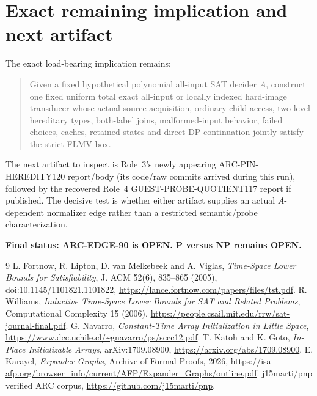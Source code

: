 \documentclass[11pt]{article}
\begin{document}
\section{Exact remaining implication and next artifact}
The exact load-bearing implication remains:
\begin{quote}
Given a fixed hypothetical polynomial all-input SAT decider $A$, construct one
fixed uniform total exact all-input or locally indexed hard-image transducer
whose actual source acquisition, ordinary-child access, two-level hereditary
types, both-label joins, malformed-input behavior, failed choices, caches,
retained states and direct-DP continuation jointly satisfy the strict FLMV
box.
\end{quote}
The next artifact to inspect is Role~3's newly appearing
ARC-PIN-HEREDITY120 report/body (its code/raw commits arrived during this run),
followed by the recovered Role~4 GUEST-PROBE-QUOTIENT117 report if published.
The decisive test is whether either artifact supplies an actual $A$-dependent
normalizer edge rather than a restricted semantic/probe characterization.

\textbf{Final status: ARC-EDGE-90 is OPEN.  P versus NP remains OPEN.}

\begin{thebibliography}{9}
 L. Fortnow, R. Lipton, D. van Melkebeek and A. Viglas,
\emph{Time-Space Lower Bounds for Satisfiability}, J. ACM 52(6), 835--865
(2005), doi:10.1145/1101821.1101822,
\url{https://lance.fortnow.com/papers/files/tst.pdf}.
 R. Williams, \emph{Inductive Time-Space Lower Bounds for
SAT and Related Problems}, Computational Complexity 15 (2006),
\url{https://people.csail.mit.edu/rrw/sat-journal-final.pdf}.
 G. Navarro, \emph{Constant-Time Array Initialization in
Little Space}, \url{https://www.dcc.uchile.cl/~gnavarro/ps/sccc12.pdf}.
 T. Katoh and K. Goto, \emph{In-Place Initializable Arrays},
arXiv:1709.08900, \url{https://arxiv.org/abs/1709.08900}.
 E. Karayel, \emph{Expander Graphs}, Archive of Formal Proofs,
2026, \url{https://isa-afp.org/browser_info/current/AFP/Expander_Graphs/outline.pdf}.
 j15marti/pnp verified ARC corpus,
\url{https://github.com/j15marti/pnp}.
\end{thebibliography}
\end{document}
